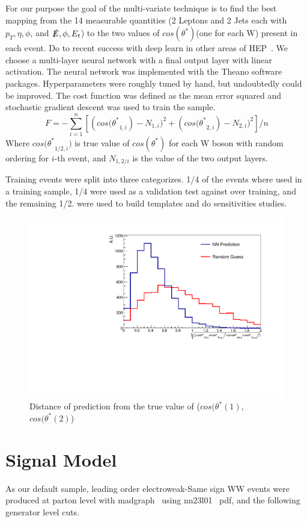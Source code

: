 \documentclass[10pt,twocolumn]{article}
\def\ts{\ensuremath{ \theta^{*} }\xspace}
\def\cts{\ensuremath{ cos(\ts) }\xspace}
\def\ctsnb{\ensuremath{ cos(\ts }\xspace}
\def\pt{\ensuremath{ p_T }\xspace}
\begin{document}
For our purpose the goal of the multi-variate technique is to find the best mapping from the 14 measurable quantities (2 Leptons and 2 Jets each with $\pt,\eta,\phi$, and $\slashed{E}, \phi, E_{t}$) to the two values of \cts (one for each W) present in each event. Do to recent success with deep learn in other areas of HEP~\cite{Baldi:2014pta,Baldi:2014pta}. We choose a multi-layer neural network with a final output layer with linear activation. The neural network was implemented with the Theano software packages. Hyperparameters were roughly tuned by hand, but undoubtedly could be improved. The cost function was defined as the mean error squared and stochastic gradient descent was used to train the sample.
\small
\begin{equation}
F=-\sum_{i=1}^{n} [(\ctsnb_{1,i})-N_{1,i})^2+(\ctsnb_{2,i})-N_{2,i})^2]/n
\end{equation}
\normalsize
Where $\ctsnb_{1/2,i})$ is true value of \cts for each W boson with random ordering for $i$-th event, and $N_{1,2/i}$ is the value of the two output layers. 

Training events were split into three categorizes. 1/4 of the events where used in a training sample, 1/4 were used as a validation test against over training, and the remaining 1/2. were used to build templates and do sensitivities studies. 


\begin{figure}
\includegraphics[width=.45\textwidth]{./fig/OneD_cts_compare.pdf}
\caption{\label{fig:mlp_err} Distance of prediction from the true value of ($\ctsnb(1)$,$\ctsnb(2)$)}
\end{figure}







\section{Signal Model}


As our default sample, leading order electroweak-Same sign WW events were produced at parton level with madgraph~\cite{} using nn23l01~\cite{} pdf, and the following generator level cuts. 
\end{document}
